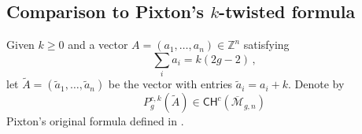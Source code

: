 \documentclass[a4paper,12pt]{article} %
\newcommand{\bb}[1]{{\mathbb{#1}}}
\newcommand{\ca}[1]{{\mathcal{#1}}}
\def\V{\mathrm{V}}
\theoremstyle{definition}
\newtheorem{remark}[definition]{Remark}
\theoremstyle{plain}%
\newcommand{\Chow}{\mathsf{CH}}
\newcommand{\DRop}{\mathsf{DR}^{\mathsf{op}}}
\begin{document}





\subsection{Comparison to Pixton's \texorpdfstring{$k$}{k}-twisted  formula}\label{sec:pixton_ktwist_vs_univ}
Given $k \geq 0$ and a vector $A =(a_1,\ldots,a_n) \in \mathbb{Z}^n$ satisfying $$\sum_i a_i = k(2g-2)\, ,$$
let $\tilde A = (\tilde{a}_1,\ldots,\tilde{a}_n)$ be the vector with entries $\tilde a_i = a_i + k$. Denote by  
\[P_g^{c ,k}(\tilde A) \in \Chow^c(\overline{\mathcal{M}}_{g,n})\] Pixton's original formula  defined in \cite[Section 1.1]{Janda2016Double-ramifica}.
\end{document}
